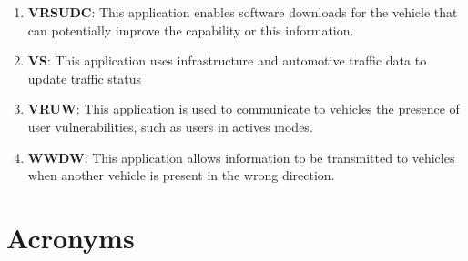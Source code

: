 \begin{enumerate}
\item \textbf{\acrfull{VRSUDC}}: This application enables software downloads for the vehicle that can potentially improve the capability or this information. \cite{etsi_etsi_tr_102_638_intelligent_2009}
\item \textbf{\acrfull{VS}}: This application uses infrastructure and automotive traffic data to update traffic status \cite{etsi_etsi_tr_102_638_intelligent_2009,boban_use_2017,raza_social_2018}
\item \textbf{\acrfull{VRUW}}: This application is used to communicate to vehicles the presence of user vulnerabilities, such as users in actives modes. \cite{etsi_etsi_tr_102_638_intelligent_2009,anaya_vulnerable_2015,raza_social_2018,al-sultan_comprehensive_2014,sewalkar_vehicle--pedestrian_2019,bila_vehicles_2017,5gpp_5g_2015,usdt_intelligent_2021,zeng_potential_2012,boban_use_2017}
\item \textbf{\acrfull{WWDW}}: This application allows information to be transmitted to vehicles when another vehicle is present in the wrong direction. \cite{etsi_etsi_tr_102_638_intelligent_2009,karagiannis_vehicular_2011,zeng_potential_2012,vogel_cloud-based_2017}
\end{enumerate}


\section{Acronyms}
\printnoidxglossary[type=\acronymtype]









